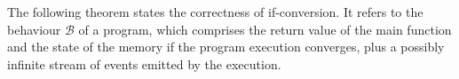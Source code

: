 

The following theorem states the correctness of if-conversion. It refers to the behaviour
$\mathcal{B}$ of a program, which comprises the return value of the main
function and the state of the memory if the program execution converges, plus a possibly infinite stream of events emitted by the execution.

